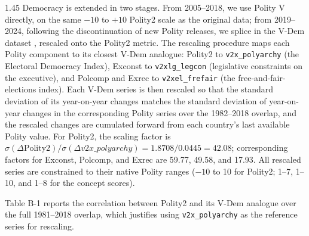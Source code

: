 \documentclass[12pt]{article}
\begin{document}
\begin{bibunit}[jpe]
\begin{spacing}{1.45}
Democracy is extended in two stages. From 2005--2018, we use Polity V \citep{marshall2020polity5} directly, on the same $-10$ to $+10$ Polity2 scale as the original data; from 2019--2024, following the discontinuation of new Polity releases, we splice in the V-Dem dataset \citep{coppedge2024vdem}, rescaled onto the Polity2 metric. The rescaling procedure maps each Polity component to its closest V-Dem analogue: Polity2 to \texttt{v2x\_polyarchy} (the Electoral Democracy Index), Exconst to \texttt{v2xlg\_legcon} (legislative constraints on the executive), and Polcomp and Exrec to \texttt{v2xel\_frefair} (the free-and-fair-elections index). Each V-Dem series is then rescaled so that the standard deviation of its year-on-year changes matches the standard deviation of year-on-year changes in the corresponding Polity series over the 1982--2018 overlap, and the rescaled changes are cumulated forward from each country's last available Polity value. For Polity2, the scaling factor is $\sigma(\Delta\text{Polity2})/\sigma(\Delta v2x\_polyarchy) = 1.8708/0.0445 = 42.08$; corresponding factors for Exconst, Polcomp, and Exrec are 59.77, 49.58, and 17.93. All rescaled series are constrained to their native Polity ranges ($-10$ to 10 for Polity2; 1--7, 1--10, and 1--8 for the concept scores).

Table B-1 reports the correlation between Polity2 and its V-Dem analogue over the full 1981--2018 overlap, which justifies using \texttt{v2x\_polyarchy} as the reference series for rescaling.


\end{spacing}
\end{bibunit}
\end{document}
